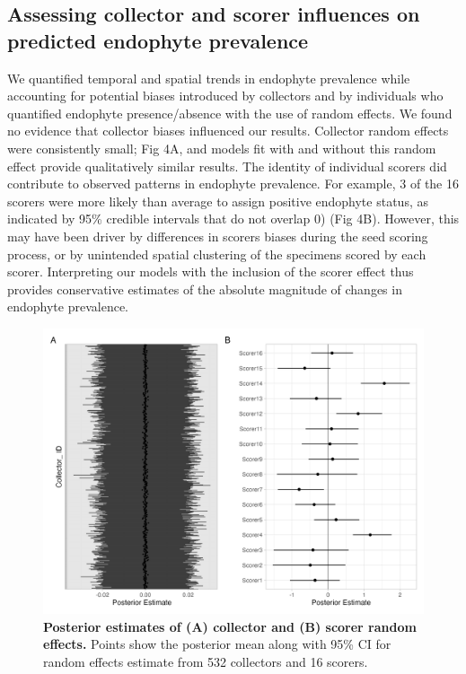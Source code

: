 \documentclass[11pt]{article}
\begin{document}
\subsection*{Assessing collector and scorer influences on predicted endophyte prevalence}
We quantified temporal and spatial trends in endophyte prevalence while accounting for potential biases introduced by collectors and by individuals who quantified endophyte presence/absence with the use of random effects. 
We found no evidence that collector biases influenced our results. 
Collector random effects were consistently small; Fig 4A, and models fit with and without this random effect provide qualitatively similar results.
The identity of individual scorers did contribute to observed patterns in endophyte prevalence.
For example, 3 of the 16 scorers were more likely than average to assign positive endophyte status, as indicated by 95\% credible intervals that do not overlap 0) (Fig 4B). 
However, this may have been driver by differences in scorers biases during the seed scoring process, or by unintended spatial clustering of the specimens scored by each scorer. 
Interpreting our models with the inclusion of the scorer effect thus provides conservative estimates of the absolute magnitude of changes in endophyte prevalence.

\begin{figure}[H]
	\label{fig:random_fx}
	\centering
	\includegraphics[width = .8\linewidth]{random_fx_plot.png}
	\caption{\textbf{Posterior estimates of (A) collector and (B) scorer random effects.} Points show the posterior mean along with 95\% CI for random effects estimate from 532 collectors and 16 scorers.}
\end{figure}
\end{document}
